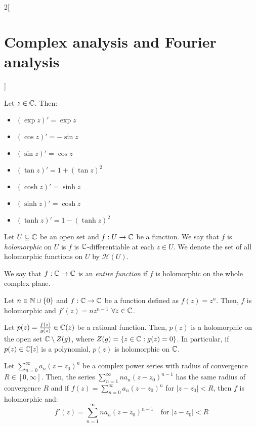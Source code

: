 \documentclass[../../../main.tex]{subfiles}
\begin{document}
\begin{multicols}{2}[\section{Complex analysis and Fourier analysis}]
\begin{theorem}
  \end{theorem}
  \begin{proposition}
    Let $z\in\mathbb{C}$. Then:
    \begin{itemize}
      \item ${\left(\exp{z}\right)}'=\exp{z}$
      \item ${\left(\cos{z}\right)}'=-\sin{z}$
      \item ${\left(\sin{z}\right)}'=\cos{z}$
      \item ${\left(\tan{z}\right)}'=1+{(\tan{z})}^2$
      \item ${\left(\cosh{z}\right)}'=\sinh{z}$
      \item ${\left(\sinh{z}\right)}'=\cosh{z}$
      \item ${\left(\tanh{z}\right)}'=1-{(\tanh{z})}^2$
    \end{itemize}
  \end{proposition}
  \begin{definition}
    Let $U\subseteq \mathbb{C}$ be an open set and $f:U\rightarrow \mathbb{C}$ be a function. We say that $f$ is \emph{holomorphic} on $U$ is $f$ is $\mathbb{C}$-differentiable at each $z\in U$. We denote the set of all holomorphic functions on $U$ by $\mathcal{H}(U)$.
  \end{definition}
  \begin{definition}
    We say that $f:\mathbb{C}\rightarrow\mathbb{C}$ is an \emph{entire function} if $f$ is holomorphic on the whole complex plane.
  \end{definition}
  \begin{proposition}
    Let $n\in\mathbb{N}\cup\{0\}$ and $f:\mathbb{C}\rightarrow\mathbb{C}$ be a function defined as  $f(z)=z^n$. Then, $f$ is holomorphic and $f'(z)=nz^{n-1}$ $\forall z\in\mathbb{C}$.
  \end{proposition}
  \begin{corollary}
    Let $p(z)=\frac{f(z)}{g(z)}\in\mathbb{C}(z)$ be a rational function. Then, $p(z)$ is a holomorphic on the open set $\mathbb{C}\setminus Z(g)$, where $Z(g)=\{z\in\mathbb{C}:g(z)=0\}$.
    In particular, if $p(z)\in\mathbb{C}[z]$ is a polynomial, $p(z)$ is holomorphic on $\mathbb{C}$.
  \end{corollary}
  \begin{theorem}
    Let $\sum_{n=0}^\infty a_n{(z-z_0)}^n$ be a complex power series with radius of convergence $R\in[0,\infty]$. Then, the series $\sum_{n=1}^\infty na_n{(z-z_0)}^{n-1}$ has the same radius of convergence $R$ and if $f(z)=\sum_{n=0}^\infty a_n{(z-z_0)}^n$ for $|z-z_0|<R$, then $f$ is holomorphic and: $$f'(z)=\sum_{n=1}^\infty na_n{(z-z_0)}^{n-1}\quad\text{for } |z-z_0|<R$$

\end{theorem}
\end{multicols}
\end{document}

